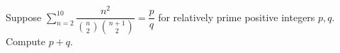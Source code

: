 Suppose $\displaystyle\sum_{n=2}^{10}\dfrac{n^2}{\binom n2\binom{n+1}2}=\dfrac pq$ for relatively prime positive integers $p,q$. Compute $p+q$.
